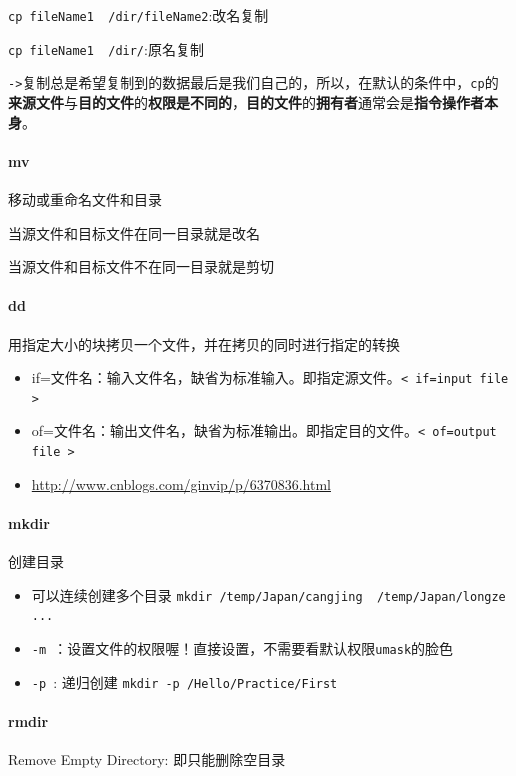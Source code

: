 \documentclass[UTF8,a4paper,12pt]{ctexbook}
\begin{document}
			\verb|cp fileName1  /dir/fileName2|:改名复制
			
			\verb|cp fileName1  /dir/|:原名复制
			
			\verb|->|复制总是希望复制到的数据最后是我们自己的，所以，在默认的条件中，\verb|cp|的\textbf{来源文件}与\textbf{目的文件}的\textbf{权限是不同的}，\textbf{目的文件}的\textbf{拥有者}通常会是\textbf{指令操作者本身}。
			
		\paragraph{mv} 移动或重命名文件和目录
		
			当源文件和目标文件在同一目录就是改名
			
			当源文件和目标文件不在同一目录就是剪切
			
		\paragraph{dd} 用指定大小的块拷贝一个文件，并在拷贝的同时进行指定的转换
			\begin{itemize}[itemindent = 1em]
				\item if=文件名：输入文件名，缺省为标准输入。即指定源文件。\verb|< if=input file >|
				\item of=文件名：输出文件名，缺省为标准输出。即指定目的文件。\verb|< of=output file >|
				\item \url{http://www.cnblogs.com/ginvip/p/6370836.html}
			\end{itemize}
			
		\paragraph{mkdir} 创建目录
			\begin{itemize}[itemindent = 1em]
				\item 可以连续创建多个目录 \verb|mkdir /temp/Japan/cangjing  /temp/Japan/longze ...|
				\item \verb|-m |：设置文件的权限喔！直接设置，不需要看默认权限\verb|umask|的脸色
				\item \verb|-p |: 递归创建 \verb|mkdir -p /Hello/Practice/First|
			\end{itemize}
			
		\paragraph{rmdir} Remove Empty Directory: 即只能删除空目录
\end{document}

